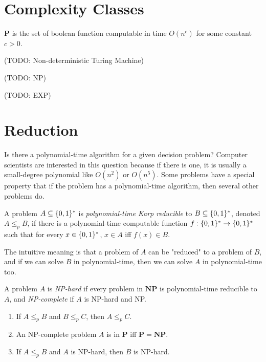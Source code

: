     \section {Complexity Classes}
        \begin{defn}[P] \label{def_comp_p}
        $\mathbf{P}$ is the set of boolean function computable in time $O(n^c)$ for some constant $c>0$.
        \end{defn}
        
        (TODO: Non-deterministic Turing Machine)
        
        (TODO: NP)
        
        (TODO: EXP)
    
    \section {Reduction}
        Is there a polynomial-time algorithm for a given decision problem? Computer scientists are interested in this question because if there is one, it is usually a small-degree polynomial like $O(n^2)$ or $O(n^5)$. Some problems have a special property that if the problem has a polynomial-time algorithm, then several other problems do.
        
        \begin{defn} \label{def_poly_karp}
            A problem $A \subseteq \{0,1\}^\ast$ is \emph{polynomial-time Karp reducible} to $B \subseteq \{0,1\}^\ast$, denoted $A \leq_p B$, if there is a polynomial-time computable function $f: \{0,1\}^\ast \rightarrow \{0,1\}^\ast$ such that for every $x \in \{0,1\}^\ast$, $x \in A$ iff $f(x) \in B$.
        \end{defn}
        
        The intuitive meaning is that a problem of $A$ can be "reduced" to a problem of $B$, and if we can solve $B$ in polynomial-time, then we can solve $A$ in polynomial-time too.
        
        \begin{defn}[NP-complete] \label{def_npc}
            A problem $A$ is \emph{NP-hard} if every problem in $\mathbf{NP}$ is polynomial-time reducible to $A$, and \emph{NP-complete} if $A$ is NP-hard and NP.
        \end{defn}
        
        \begin{thm} \label{thm_leqp_transitive}
            \begin{enumerate}
                \item If $A \leq_p B$ and $B \leq_p C$, then $A \leq_p C$.
                \item An NP-complete problem $A$ is in $\mathbf{P}$ iff $\mathbf{P}=\mathbf{NP}$.
                \item If $A \leq_p B$ and $A$ is NP-hard, then $B$ is NP-hard.
            \end{enumerate}
        \end{thm}
        
